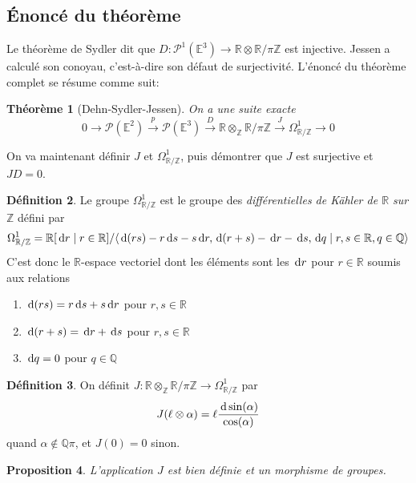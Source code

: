 \documentclass{article}
\newcommand{\Z}{\mathbb{Z}}
\newcommand{\Q}{\mathbb{Q}}
\newcommand{\R}{\mathbb{R}}
\newcommand{\E}{\mathbb{E}}
\renewcommand{\P}{\mathcal{P}}
\renewcommand{\d}{{\rm \, d}}
\theoremstyle{plain}
\newtheorem{theorem}{Théorème}
\newtheorem{proposition}[theorem]{Proposition}
\theoremstyle{definition}
\newtheorem{definition}[theorem]{Définition}
\theoremstyle{remark}
\begin{document}
\subsection{Énoncé du théorème}
Le théorème de Sydler dit que $D : \P^1(\E^3) \to \R \otimes \R/\pi\Z$ est injective. Jessen a calculé son conoyau, c'est-à-dire son défaut de surjectivité. L'énoncé du théorème complet se résume comme suit:
\begin{theorem}[Dehn-Sydler-Jessen]
    On a une suite exacte
    \[0 \to \P(\E^2) \xrightarrow{p} \P(\E^3) \xrightarrow{D} \R \otimes_\Z \R/\pi\Z \xrightarrow{J} \Omega_{\R/\Z}^1 \to 0\]
\end{theorem}

On va maintenant définir $J$ et $\Omega_{\R/\Z}^1$, puis démontrer que $J$ est surjective et $JD = 0$.

\begin{definition}
    Le groupe $\Omega_{\R/\Z}^1$ est le groupe des \emph{différentielles de Kähler de $\R$ sur $\Z$} défini par
    \[\Omega_{\R/\Z}^1 = \R[\d r\mid r \in \R]/\langle \d(rs) - r\d s - s\d r, \d (r+s) - \d r - \d s, \d q \mid r,s \in \R, q \in \Q\rangle\]
    C'est donc le $\R$-espace vectoriel dont les éléments sont les $\d r$ pour $r \in \R$ soumis aux relations
    \begin{enumerate}
        \item $\d (rs) = r \d s + s \d r$ pour $r,s \in \R$
        \item $\d (r + s) = \d r + \d s$ pour $r,s \in \R$
        \item $\d q = 0$ pour $q \in \Q$
    \end{enumerate}
\end{definition}

\begin{definition}
    On définit $J : \R\otimes_\Z \R/\pi\Z \to \Omega_{\R/\Z}^1$ par
    \[J(\ell \otimes \alpha) = \ell \frac{\d \sin(\alpha)}{\cos(\alpha)}\] quand $\alpha \notin \Q\pi$, et $J(0) = 0$ sinon.
\end{definition}

\begin{proposition}
    L'application $J$ est bien définie et un morphisme de groupes.
\end{proposition}
\end{document}
